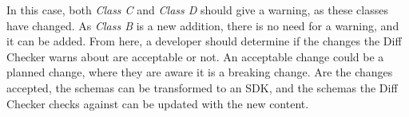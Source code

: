 In this case, both \textit{Class C} and \textit{Class D} should give a warning, as these classes have changed. As \textit{Class B} is a new addition, there is no need for a warning, and it can be added. From here, a developer should determine if the changes the Diff Checker warns about are acceptable or not. An acceptable change could be a planned change, where they are aware it is a breaking change. Are the changes accepted, the schemas can be transformed to an SDK, and the schemas the Diff Checker checks against can be updated with the new content.